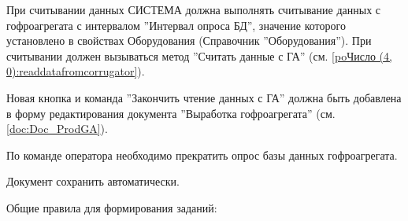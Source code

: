 При считывании данных СИСТЕМА должна выполнять считывание данных с гофроагрегата с интервалом ''Интервал опроса БД'', значение которого установлено в свойствах Оборудования (Справочник ''Оборудования'').
При считывании должен вызываться метод ''Считать данные с ГА'' (см. \ref{poЧисло (4, 0):readdatafromcorrugator}).

\bigskip

\label{sec:stopreading}

Новая кнопка и команда ''Закончить чтение данных с ГА'' должна быть добавлена в форму редактирования документа ''Выработка гофроагрегата'' (см. \ref{doc:Doc_ProdGA}).

По команде оператора необходимо прекратить опрос базы данных гофроагрегата.

Документ сохранить автоматически.


\bigskip

\label{poЧисло (4, 0):readdatafromcorrugator}


Общие правила для формирования заданий:

